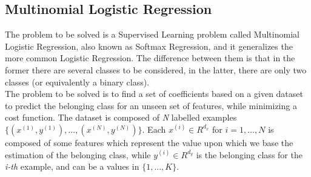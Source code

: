 \documentclass[a4paper,11pt,oneside]{book}
\begin{document}
\subsection {Multinomial Logistic Regression} \label{Subsec1.1.2}
The problem to be solved is a Supervised Learning problem called Multinomial Logistic Regression, also known as Softmax Regression, and it generalizes the more common Logistic Regression. The difference between them is that in the former there are several classes to be considered, in the latter, there are only two classes (or equivalently a binary class).\\
The problem to be solved is to find a set of coefficients based on a given dataset to predict the belonging class for an unseen set of features, while minimizing a cost function. The dataset is composed of \textit{N} labelled examples $\{(x^{(1)}, y^{(1)}), ..., (x^{(N)}, y^{(N)})\}$. Each $x^{(i)} \in R^{d_{x}}$ for $i=1, ..., N$ is composed of some features which represent the value upon which we base the estimation of the belonging class, while $y^{(i)} \in R^{d_{y}}$ is the belonging class for the \textit{i-th} example, and can be a values in $\{1, ..., K\}$.
\end{document}
